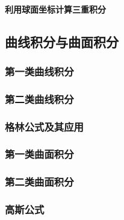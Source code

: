 \documentclass[
]{article}
\begin{document}
\hypertarget{ux5229ux7528ux7403ux9762ux5750ux6807ux8ba1ux7b97ux4e09ux91cdux79efux5206}{%
\paragraph{利用球面坐标计算三重积分}\label{ux5229ux7528ux7403ux9762ux5750ux6807ux8ba1ux7b97ux4e09ux91cdux79efux5206}}

\hypertarget{ux66f2ux7ebfux79efux5206ux4e0eux66f2ux9762ux79efux5206}{%
\subsection{曲线积分与曲面积分}\label{ux66f2ux7ebfux79efux5206ux4e0eux66f2ux9762ux79efux5206}}

\hypertarget{ux7b2cux4e00ux7c7bux66f2ux7ebfux79efux5206}{%
\subsubsection{第一类曲线积分}\label{ux7b2cux4e00ux7c7bux66f2ux7ebfux79efux5206}}

\hypertarget{ux7b2cux4e8cux7c7bux66f2ux7ebfux79efux5206}{%
\subsubsection{第二类曲线积分}\label{ux7b2cux4e8cux7c7bux66f2ux7ebfux79efux5206}}

\hypertarget{ux683cux6797ux516cux5f0fux53caux5176ux5e94ux7528}{%
\subsubsection{格林公式及其应用}\label{ux683cux6797ux516cux5f0fux53caux5176ux5e94ux7528}}

\hypertarget{ux7b2cux4e00ux7c7bux66f2ux9762ux79efux5206}{%
\subsubsection{第一类曲面积分}\label{ux7b2cux4e00ux7c7bux66f2ux9762ux79efux5206}}

\hypertarget{ux7b2cux4e8cux7c7bux66f2ux9762ux79efux5206}{%
\subsubsection{第二类曲面积分}\label{ux7b2cux4e8cux7c7bux66f2ux9762ux79efux5206}}

\hypertarget{ux9ad8ux65afux516cux5f0f}{%
\subsubsection{高斯公式}\label{ux9ad8ux65afux516cux5f0f}}
\end{document}
